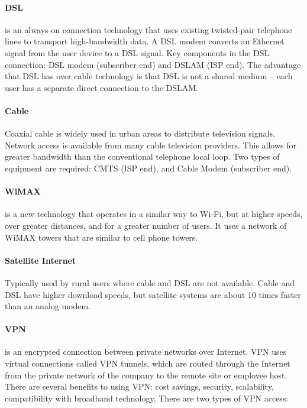 \paragraph{DSL}is an always-on connection technology that uses existing twisted-pair telephone lines to transport high-bandwidth data. A DSL modem converts an Ethernet signal from the user device to a DSL signal. Key components in the DSL connection: DSL modem (subscriber end) and DSLAM (ISP end). The advantage that DSL has over cable technology is that DSL is not a shared medium -- each user has a separate direct connection to the DSLAM.

\paragraph{Cable} Coaxial cable is widely used in urban areas to distribute television signals. Network access is available from many cable television providers. This allows for greater bandwidth than the conventional telephone local loop. Two types of equipment are required: CMTS (ISP end), and Cable Modem (subscriber end).

\paragraph{WiMAX} is a new technology that operates in a similar way to Wi-Fi, but at higher speeds, over greater distances, and for a greater number of users. It uses a network of WiMAX towers that are similar to cell phone towers. 

\paragraph{Satellite Internet}Typically used by rural users where cable and DSL are not available. Cable and DSL have higher download speeds, but satellite systems are about 10 times faster than an analog modem. 

\paragraph{VPN}is an encrypted connection between private networks over Internet. VPN uses virtual connections called VPN tunnels, which are routed through the Internet from the private network of the company to the remote site or employee host. There are several benefits to using VPN: cost savings, security, scalability, compatibility with broadband technology. There are two types of VPN access: 


